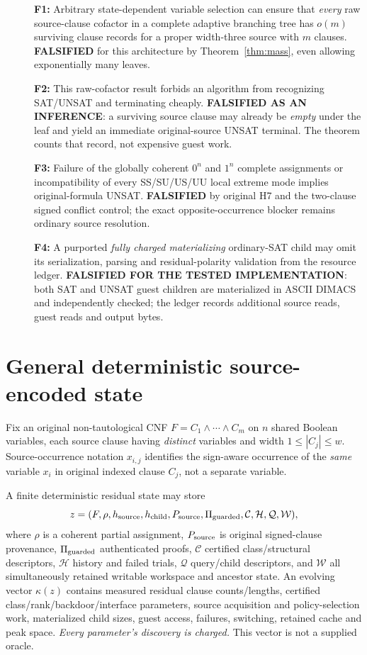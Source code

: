 \documentclass[11pt]{article}
\begin{document}
\begin{description}
\item[] \textbf{F1:} Arbitrary state-dependent variable selection can ensure that \emph{every} raw source-clause cofactor in a complete adaptive branching tree has $o(m)$ surviving clause records for a proper width-three source with $m$ clauses. \textbf{FALSIFIED} for this architecture by Theorem~\ref{thm:mass}, even allowing exponentially many leaves.
\item[] \textbf{F2:} This raw-cofactor result forbids an algorithm from recognizing SAT/UNSAT and terminating cheaply. \textbf{FALSIFIED AS AN INFERENCE}: a surviving source clause may already be \emph{empty} under the leaf and yield an immediate original-source UNSAT terminal. The theorem counts that record, not expensive guest work.
\item[] \textbf{F3:} Failure of the globally coherent $0^n$ and $1^n$ complete assignments or incompatibility of every SS/SU/US/UU local extreme mode implies original-formula UNSAT. \textbf{FALSIFIED} by original H7 and the two-clause signed conflict control; the exact opposite-occurrence blocker remains ordinary source resolution.
\item[] \textbf{F4:} A purported \emph{fully charged materializing} ordinary-SAT child may omit its serialization, parsing and residual-polarity validation from the resource ledger. \textbf{FALSIFIED FOR THE TESTED IMPLEMENTATION}: both SAT and UNSAT guest children are materialized in ASCII DIMACS and independently checked; the ledger records additional source reads, guest reads and output bytes.
\end{description}

\section{General deterministic source-encoded state}
Fix an original non-tautological CNF $F=C_1\land\cdots\land C_m$ on $n$ shared Boolean variables, each source clause having \emph{distinct} variables and width $1\le |C_j|\le w$. Source-occurrence notation $x_{i,j}$ identifies the sign-aware occurrence of the \emph{same} variable $x_i$ in original indexed clause $C_j$, not a separate variable.

A finite deterministic residual state may store
\[
z=(F,\rho,h_{\rm source},h_{\rm child},P_{\rm source},
  \Pi_{\rm guarded},\mathcal C,\mathcal H,\mathcal Q,\mathcal W),
\]
where $\rho$ is a coherent partial assignment, $P_{\rm source}$ is original signed-clause provenance, $\Pi_{\rm guarded}$ authenticated proofs, $\mathcal C$ certified class/structural descriptors, $\mathcal H$ history and failed trials, $\mathcal Q$ query/child descriptors, and $\mathcal W$ all simultaneously retained writable workspace and ancestor state. An evolving vector $\kappa(z)$ contains measured residual clause counts/lengths, certified class/rank/backdoor/interface parameters, source acquisition and policy-selection work, materialized child sizes, guest access, failures, switching, retained cache and peak space. \emph{Every parameter's discovery is charged.} This vector is not a supplied oracle.
\end{document}
